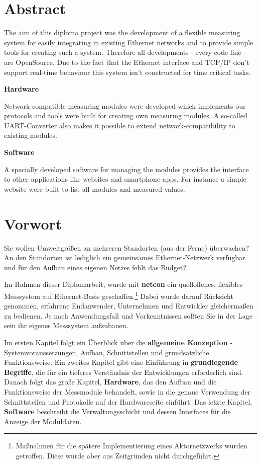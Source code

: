 \documentclass[a4paper,14pt,headsepline]{scrartcl}
\begin{document}
\section*{Abstract}
The aim of this diploma project was the development of a flexible measuring system for easily integrating in existing Ethernet networks and to provide simple tools for creating such a system. Therefore all developments - every code line - are OpenSource. Due to the fact that the Ethernet interface and TCP/IP don't support real-time behaviour this system isn't constructed for time critical tasks. 

\textbf{Hardware}

Network-compatible measuring modules were developed which implements our protocols and tools were built for creating own measuring modules. A so-called UART-Converter also makes it possible to extend network-compatibility to existing modules. 

\textbf{Software}

A specially developed software for managing the modules provides the interface to other applications like websites and smartphone-apps. For instance a simple website were built to list all modules and measured values.


\newpage

\section*{Vorwort}
Sie wollen Umweltgrößen an mehreren Standorten (aus der Ferne) überwachen? An den Standorten ist lediglich ein gemeinsames Ethernet-Netzwerk verfügbar und für den Aufbau eines eigenen Netzes fehlt das Budget?

Im Rahmen dieser Diplomarbeit, wurde mit \textbf{netcon} ein quelloffenes, flexibles Messsystem auf Ethernet-Basis geschaffen.\footnote{Maßnahmen für die spätere Implementierung eines Aktornetzwerks wurden getroffen. Diese wurde aber aus Zeitgründen nicht durchgeführt. } Dabei wurde darauf Rücksicht genommen, erfahrene Endanwender, Unternehmen und Entwickler gleichermaßen zu bedienen. Je nach Anwendungsfall und Vorkenntnissen sollten Sie in der Lage sein ihr eigenes Messsystem aufzubauen. 

Im ersten Kapitel folgt ein Überblick über die \textbf{allgemeine Konzeption} - Systemvoraussetzungen, Aufbau, Schnittstellen und grundsätzliche Funktionsweise. Ein zweites Kapitel gibt eine Einführung in \textbf{grundlegende Begriffe}, die für ein tieferes Verständnis der Entwicklungen erforderlich sind. Danach folgt das große Kapitel, \textbf{Hardware}, das den Aufbau und die Funktionsweise der Messmodule behandelt, sowie in die genaue Verwendung der Schnittstellen und Protokolle auf der Hardwareseite einführt. Das letzte Kapitel, \textbf{Software} beschreibt die Verwaltungsschicht und dessen Interfaces für die Anzeige der Moduldaten.  
\end{document}
